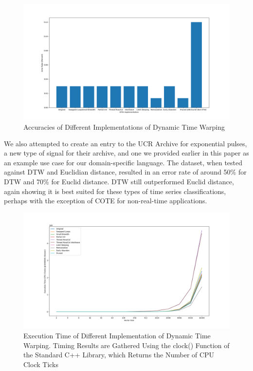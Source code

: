 \documentclass[sigconf,authordraft]{acmart}
\begin{document}
\begin{figure}
    \centering
    \includegraphics[width=\linewidth]{img/accuracy_results.png}
    \caption{Accuracies of Different Implementations of Dynamic Time Warping}
    \label{fig:accuracy}
\end{figure}

We also attempted to create an entry to the UCR Archive for exponential pulses, a new type of signal for their archive, and one we provided earlier in this paper as an example use case for our domain-specific language. The dataset, when tested against DTW and Euclidian distance, resulted in an error rate of around 50\% for DTW and 70\% for Euclid distance. DTW still outperformed Euclid distance, again showing it is best suited for these types of time series classifications, perhaps with the exception of COTE for non-real-time applications. 

\begin{figure}
    \centering
    \includegraphics[width=\linewidth]{img/timing_results.png}
    \caption{Execution Time of Different Implementation of Dynamic Time Warping. Timing Results are Gathered Using the clock() Function of the Standard C++ Library, which Returns the Number of CPU Clock Ticks}
    \label{fig:timing}
\end{figure}
\end{document}
